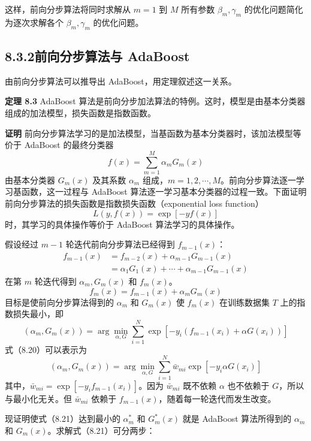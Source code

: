 \documentclass[UTF8,12pt,a4paper,fontset=fandol]{ctexart}
\begin{document}
这样，前向分步算法将同时求解从 $m=1$ 到 $M$ 所有参数 $\beta_m,\gamma_m$ 的优化问题简化为逐次求解各个 $\beta_m,\gamma_m$ 的优化问题。

\subsection*{8.3.2\quad 前向分步算法与 AdaBoost}

由前向分步算法可以推导出 AdaBoost，用定理叙述这一关系。

\noindent\textbf{定理 8.3}\quad
AdaBoost 算法是前向分步加法算法的特例。这时，模型是由基本分类器组成的加法模型，损失函数是指数函数。

\noindent\textbf{证明}\quad
前向分步算法学习的是加法模型，当基函数为基本分类器时，该加法模型等价于 AdaBoost 的最终分类器
\begin{equation}
f(x)=\sum_{m=1}^M\alpha_mG_m(x)
\tag{8.19}
\end{equation}
由基本分类器 $G_m(x)$ 及其系数 $\alpha_m$ 组成，$m=1,2,\cdots,M$。前向分步算法逐一学习基函数，这一过程与 AdaBoost 算法逐一学习基本分类器的过程一致。下面证明前向分步算法的损失函数是指数损失函数（exponential loss function）
\[
L(y,f(x))=\exp[-yf(x)]
\]
时，其学习的具体操作等价于 AdaBoost 算法学习的具体操作。

假设经过 $m-1$ 轮迭代前向分步算法已经得到 $f_{m-1}(x)$：
\[
\begin{aligned}
f_{m-1}(x)&=f_{m-2}(x)+\alpha_{m-1}G_{m-1}(x)\\
&=\alpha_1G_1(x)+\cdots+\alpha_{m-1}G_{m-1}(x)
\end{aligned}
\]
在第 $m$ 轮迭代得到 $\alpha_m,G_m(x)$ 和 $f_m(x)$。
\[
f_m(x)=f_{m-1}(x)+\alpha_mG_m(x)
\]
目标是使前向分步算法得到的 $\alpha_m$ 和 $G_m(x)$ 使 $f_m(x)$ 在训练数据集 $T$ 上的指数损失最小，即
\begin{equation}
(\alpha_m,G_m(x))=\arg\min_{\alpha,G}
\sum_{i=1}^N \exp[-y_i(f_{m-1}(x_i)+\alpha G(x_i))]
\tag{8.20}
\end{equation}
式（8.20）可以表示为
\begin{equation}
(\alpha_m,G_m(x))=\arg\min_{\alpha,G}
\sum_{i=1}^N \bar{w}_{mi}\exp[-y_i\alpha G(x_i)]
\tag{8.21}
\end{equation}
其中，$\bar{w}_{mi}=\exp[-y_if_{m-1}(x_i)]$。因为 $\bar{w}_{mi}$ 既不依赖 $\alpha$ 也不依赖于 $G$，所以与最小化无关。但 $\bar{w}_{mi}$ 依赖于 $f_{m-1}(x)$，随着每一轮迭代而发生改变。

现证明使式（8.21）达到最小的 $\alpha_m^\ast$ 和 $G_m^\ast(x)$ 就是 AdaBoost 算法所得到的 $\alpha_m$ 和 $G_m(x)$。求解式（8.21）可分两步：
\end{document}
